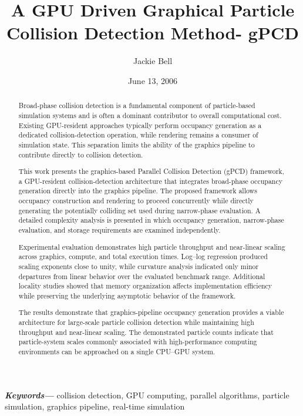 \documentclass[11pt]{article}
\title{A GPU Driven Graphical Particle Collision Detection Method- gPCD}
\author{Jackie Bell}
\date{June 13, 2006}
\providecommand{\keywords}[1]
{
  \small	
  \textbf{\textit{Keywords---}} #1
}
\begin{document}
\maketitle
\begin{abstract}

Broad-phase collision detection is a fundamental component of
particle-based simulation systems and is often a dominant contributor
to overall computational cost. Existing GPU-resident approaches
typically perform occupancy generation as a dedicated
collision-detection operation, while rendering remains a consumer of
simulation state. This separation limits the ability of the graphics
pipeline to contribute directly to collision detection.

This work presents the graphics-based Parallel Collision Detection
(gPCD) framework, a GPU-resident collision-detection architecture that
integrates broad-phase occupancy generation directly into the graphics
pipeline. The proposed framework allows occupancy construction and
rendering to proceed concurrently while directly generating the
potentially colliding set used during narrow-phase evaluation. A
detailed complexity analysis is presented in which occupancy
generation, narrow-phase evaluation, and storage requirements are
examined independently.

Experimental evaluation demonstrates high particle throughput and
near-linear scaling across graphics, compute, and total execution
times. Log--log regression produced scaling exponents close to unity,
while curvature analysis indicated only minor departures from linear
behavior over the evaluated benchmark range. Additional locality
studies showed that memory organization affects implementation
efficiency while preserving the underlying asymptotic behavior of the
framework.

The results demonstrate that graphics-pipeline occupancy generation
provides a viable architecture for large-scale particle collision
detection while maintaining high throughput and near-linear scaling.
The demonstrated particle counts indicate that particle-system scales
commonly associated with high-performance computing environments can be
approached on a single CPU--GPU system.

\end{abstract}

\keywords{
collision detection,
GPU computing,
parallel algorithms,
particle simulation,
graphics pipeline,
real-time simulation
}











\end{document}
